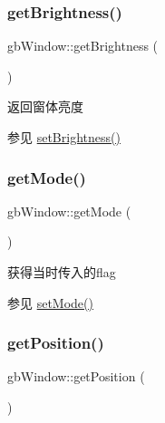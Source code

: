 \mbox{\label{classgb_window_aa5a6dbbedb1b0421c5ce41753df71ba3}} 
\subsubsection{\texorpdfstring{getBrightness()}{getBrightness()}}
{\footnotesize\ttfamily gb\+Window\+::get\+Brightness (\begin{DoxyParamCaption}{ }\end{DoxyParamCaption})}



返回窗体亮度 

\begin{DoxySeeAlso}{参见}
\mbox{\hyperlink{classgb_window_aec17f885a0d2dcf1a6d281799542071a}{set\+Brightness()}} 
\end{DoxySeeAlso}
\mbox{\label{classgb_window_af86a84effc2ab72df5dfa881c5e6d620}} 
\subsubsection{\texorpdfstring{getMode()}{getMode()}}
{\footnotesize\ttfamily gb\+Window\+::get\+Mode (\begin{DoxyParamCaption}{ }\end{DoxyParamCaption})}



获得当时传入的flag 

\begin{DoxySeeAlso}{参见}
\mbox{\hyperlink{classgb_window_abf2068b28248fb4f9ed5d39a5df58d0a}{set\+Mode()}} 
\end{DoxySeeAlso}
\mbox{\label{classgb_window_acf7f12b75b0b9b3f25105569f77e8f80}} 
\subsubsection{\texorpdfstring{getPosition()}{getPosition()}}
{\footnotesize\ttfamily gb\+Window\+::get\+Position (\begin{DoxyParamCaption}{ }\end{DoxyParamCaption})}



